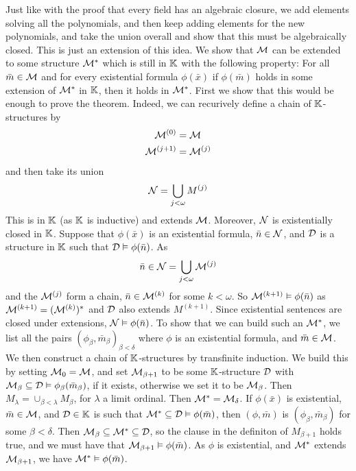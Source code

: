 \documentclass{article}
\numberwithin{thm}{subsection}
\begin{document}
\idea Just like with the proof that every field has an algebraic closure, we add elements solving all the polynomials, and then keep adding elements for the new polynomials, and take the union overall and show that this must be algebraically closed. This is just an extension of this idea.
\proof We show that $\mathcal{M}$ can be extended to some structure $\mathcal{M}^{*}$ which is still in $\mathbb{K}$ with the following property: \gap For all $\bar m \in \mathcal{M}$ and for every existential formula $\phi(\bar x)$ if $\phi(\bar m)$ holds in some extension of $\mathcal{M}^{*}$ in $\mathbb{K}$, then it holds in $\mathcal{M}^{*}$. \gap 
First we show that this would be enough to prove the theorem. Indeed, we can recurively define a chain of $\mathbb{K}$-structures by \begin{align*}
    \mathcal{M}^{(0)}&=\mathcal{M}\\
    \mathcal{M}^{(j+1)}&=\mathcal{M}^{(j)}
\end{align*}
and then take its union \[ \mathcal{N} = \bigcup_{j < \omega} M^{(j)}\] This is in $\mathbb{K}$ (as $\mathbb{K}$ is inductive) and extends $\mathcal{M}$. Moreover, $\mathcal{N}$ is existentially closed in $\mathbb{K}$. Suppose that $\phi(\bar x)$ is an existential formula, $\bar n \in \mathcal{N}$, and $\mathcal{D}$ is a structure in $\mathbb{K}$ such that $\mathcal{D} \vDash \phi( \bar n)$. As \[ \bar n \in \mathcal{N} = \bigcup_{j<\omega}\mathcal{M}^{(j)}\] and the $\mathcal{M}^{(j)}$ form a chain, $\bar n \in \mathcal{M}^{(k)}$ for some $k< \omega$. So $\mathcal{M}^{(k+1)} \vDash \phi(\bar n)$ as $\mathcal{M}^{(k+1)} = (\mathcal{M}^{(k)})^{*}$ and $\mathcal{D}$ also extends $M^{(k+1)}$. Since existential sentences are closed under extensions, $\mathcal{N} \vDash \phi( \bar n)$. \gap 
To show that we can build such an $\mathcal{M}^{*}$, we list all the pairs $(\phi_{\beta},\bar{m}_{\beta})_{\beta < \delta}$ where $\phi$ is an existential formula, and $\bar m \in \cal M$. We then construct a chain of $\mathbb{K}$-structures by transfinite induction. We build this by setting $\mathcal{M}_{0}=\mathcal{M}$, and set $\mathcal{M}_{\beta+1}$ to be some $\mathbb{K}$-structure $\mathcal{D}$ with $\mathcal{M}_{\beta} \subseteq \mathcal{D} \vDash \phi_{\beta}(\bar m_{\beta})$, if it exists, otherwise we set it to be $\mathcal{M}_{\beta}$. Then $M_{\lambda} = \cup_{\beta < \lambda} M_{\beta}$, for $\lambda$ a limit ordinal. Then $\mathcal{M}^{*}=\mathcal{M}_{\delta}$.
 \gap If $\phi(\bar x)$ is existential, $\bar m \in \mathcal{M}$, and $\mathcal{D} \in \mathbb{K}$ is such that $\mathcal{M}^{*} \subseteq \mathcal{D} \vDash \phi(\bar m)$, then $(\phi, \bar m)$ is $(\phi_{\beta}, \bar m_{\beta})$ for some $\beta< \delta$. Then $\mathcal{M}_{\beta} \subseteq \mathcal{M}^{*} \subseteq \mathcal{D}$, so the clause in the definiton of $M_{\beta +1}$ holds true, and we must have that $\mathcal{M}_{\beta +1} \vDash \phi(\bar m)$. As $\phi$ is existential, and $\mathcal{M}^{*}$ extends $\mathcal{M}_{\beta +1}$, we have $\mathcal{M}^{*} \vDash \phi(\bar m)$. \endproof
\end{document}
